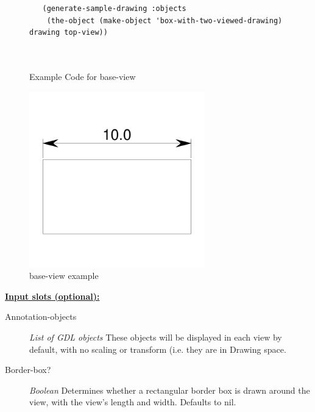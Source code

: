 \documentclass [11pt]{book}
\begin{document}
\begin{itemize}
\begin{figure}
\begin{lrbox}{\boxedverb}
\begin{minipage}{\linewidth}
{\begin{verbatim}
   (generate-sample-drawing :objects 
    (the-object (make-object 'box-with-two-viewed-drawing) drawing top-view))
 
 
\end{verbatim}}
\end{minipage}
\end{lrbox}
\fbox{\usebox{\boxedverb}}

\caption{Example Code for base-view}

\label{fig:example-code-base-view}

\end{figure}

\begin{figure}
\begin{center}
\includegraphics[width=3in,height=3in]{../images/example-base-view.pdf}
\end{center}

\caption{base-view example}

\label{fig:base-view}

\end{figure}





\textbf{
\underline{Input slots (optional):}}

\begin{description}

\item [Annotation-objects]
\emph{List of GDL objects} These objects will be displayed in each view by default, with no scaling or transform (i.e. they are in Drawing space.


\item [Border-box?]
\emph{Boolean} Determines whether a rectangular border box is drawn around the view,
with the view's length and width. Defaults to nil.



\end{description}
\end{itemize}
\end{document}
